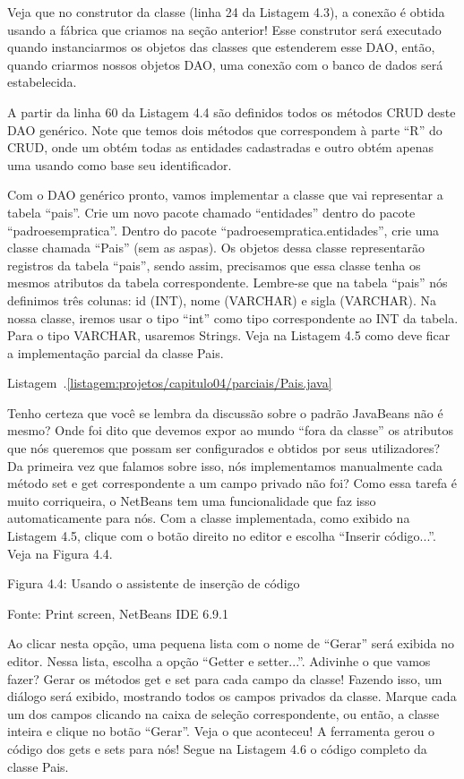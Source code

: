 Veja que no construtor da classe (linha 24 da Listagem 4.3), a conexão é obtida usando a fábrica que criamos na seção anterior! Esse construtor será executado quando instanciarmos os objetos das classes que estenderem esse DAO, então, quando criarmos nossos objetos DAO, uma conexão com o banco de dados será estabelecida.

A partir da linha 60 da Listagem 4.4 são definidos todos os métodos CRUD deste DAO genérico. Note que temos dois métodos que correspondem à parte ``R'' do CRUD, onde um obtém todas as entidades cadastradas e outro obtém apenas uma usando como base seu identificador.

Com o DAO genérico pronto, vamos implementar a classe que vai representar a tabela ``pais''. Crie um novo pacote chamado ``entidades'' dentro do pacote ``padroesempratica''. Dentro do pacote ``padroesempratica.entidades'', crie uma classe chamada ``Pais'' (sem as aspas). Os objetos dessa classe representarão registros da tabela ``pais'', sendo assim, precisamos que essa classe tenha os mesmos atributos da tabela correspondente. Lembre-se que na tabela ``pais'' nós definimos três colunas: id (INT), nome (VARCHAR) e sigla (VARCHAR). Na nossa classe, iremos usar o tipo ``int'' como tipo correspondente ao INT da tabela. Para o tipo VARCHAR, usaremos Strings. Veja na Listagem 4.5 como deve ficar a implementação parcial da classe Pais.

Listagem~\thechapter.\ref{listagem:projetos/capitulo04/parciais/Pais.java}

Tenho certeza que você se lembra da discussão sobre o padrão JavaBeans não é mesmo? Onde foi dito que devemos expor ao mundo ``fora da classe'' os atributos que nós queremos que possam ser configurados e obtidos por seus utilizadores? Da primeira vez que falamos sobre isso, nós implementamos manualmente cada método set e get correspondente a um campo privado não foi? Como essa tarefa é muito corriqueira, o NetBeans tem uma funcionalidade que faz isso automaticamente para nós. Com a classe implementada, como exibido na Listagem 4.5, clique com o botão direito no editor e escolha ``Inserir código...''. Veja na Figura 4.4.

Figura 4.4: Usando o assistente de inserção de código
 
Fonte: Print screen, NetBeans IDE 6.9.1

Ao clicar nesta opção, uma pequena lista com o nome de ``Gerar'' será exibida no editor. Nessa lista, escolha a opção ``Getter e setter...''. Adivinhe o que vamos fazer? Gerar os métodos get e set para cada campo da classe! Fazendo isso, um diálogo será exibido, mostrando todos os campos privados da classe. Marque cada um dos campos clicando na caixa de seleção correspondente, ou então, a classe inteira e clique no botão ``Gerar''. Veja o que aconteceu! A ferramenta gerou o código dos gets e sets para nós! Segue na Listagem 4.6 o código completo da classe Pais.

